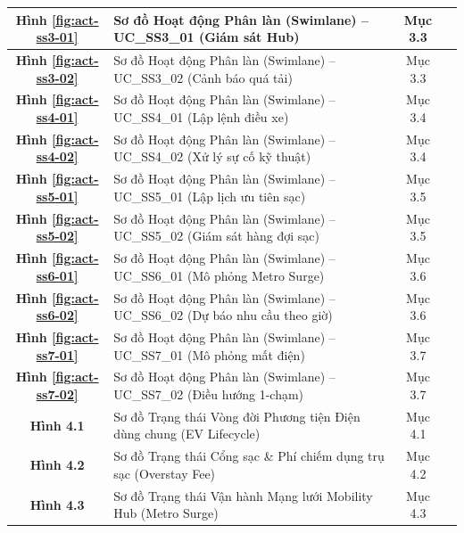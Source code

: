 \documentclass[12pt,a4paper]{article}
\begin{document}
\begin{longtable}{|c|p{8.5cm}|c|c|}
    \hline
    \textbf{Hình \ref{fig:act-ss3-01}} & Sơ đồ Hoạt động Phân làn (Swimlane) -- UC\_SS3\_01 (Giám sát Hub) & Mục 3.3 & \pageref{fig:act-ss3-01} \\
    \hline
    \textbf{Hình \ref{fig:act-ss3-02}} & Sơ đồ Hoạt động Phân làn (Swimlane) -- UC\_SS3\_02 (Cảnh báo quá tải) & Mục 3.3 & \pageref{fig:act-ss3-02} \\
    \hline
    \textbf{Hình \ref{fig:act-ss4-01}} & Sơ đồ Hoạt động Phân làn (Swimlane) -- UC\_SS4\_01 (Lập lệnh điều xe) & Mục 3.4 & \pageref{fig:act-ss4-01} \\
    \hline
    \textbf{Hình \ref{fig:act-ss4-02}} & Sơ đồ Hoạt động Phân làn (Swimlane) -- UC\_SS4\_02 (Xử lý sự cố kỹ thuật) & Mục 3.4 & \pageref{fig:act-ss4-02} \\
    \hline
    \textbf{Hình \ref{fig:act-ss5-01}} & Sơ đồ Hoạt động Phân làn (Swimlane) -- UC\_SS5\_01 (Lập lịch ưu tiên sạc) & Mục 3.5 & \pageref{fig:act-ss5-01} \\
    \hline
    \textbf{Hình \ref{fig:act-ss5-02}} & Sơ đồ Hoạt động Phân làn (Swimlane) -- UC\_SS5\_02 (Giám sát hàng đợi sạc) & Mục 3.5 & \pageref{fig:act-ss5-02} \\
    \hline
    \textbf{Hình \ref{fig:act-ss6-01}} & Sơ đồ Hoạt động Phân làn (Swimlane) -- UC\_SS6\_01 (Mô phỏng Metro Surge) & Mục 3.6 & \pageref{fig:act-ss6-01} \\
    \hline
    \textbf{Hình \ref{fig:act-ss6-02}} & Sơ đồ Hoạt động Phân làn (Swimlane) -- UC\_SS6\_02 (Dự báo nhu cầu theo giờ) & Mục 3.6 & \pageref{fig:act-ss6-02} \\
    \hline
    \textbf{Hình \ref{fig:act-ss7-01}} & Sơ đồ Hoạt động Phân làn (Swimlane) -- UC\_SS7\_01 (Mô phỏng mất điện) & Mục 3.7 & \pageref{fig:act-ss7-01} \\
    \hline
    \textbf{Hình \ref{fig:act-ss7-02}} & Sơ đồ Hoạt động Phân làn (Swimlane) -- UC\_SS7\_02 (Điều hướng 1-chạm) & Mục 3.7 & \pageref{fig:act-ss7-02} \\
    \hline
    \textbf{Hình 4.1} & Sơ đồ Trạng thái Vòng đời Phương tiện Điện dùng chung (EV Lifecycle) & Mục 4.1 & \pageref{fig:state-ev} \\
    \hline
    \textbf{Hình 4.2} & Sơ đồ Trạng thái Cổng sạc \& Phí chiếm dụng trụ sạc (Overstay Fee) & Mục 4.2 & \pageref{fig:state-charging} \\
    \hline
    \textbf{Hình 4.3} & Sơ đồ Trạng thái Vận hành Mạng lưới Mobility Hub (Metro Surge) & Mục 4.3 & \pageref{fig:state-hub} \\
    \hline
\end{longtable}
\end{document}
